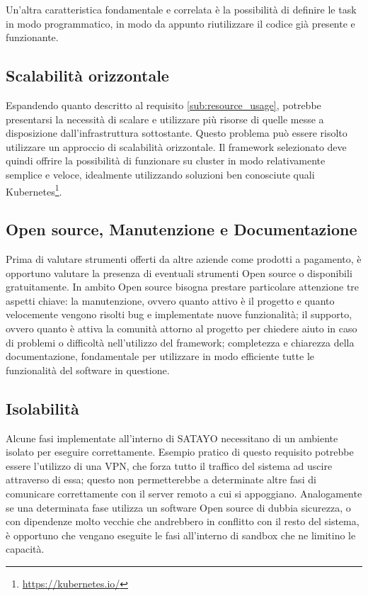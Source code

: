 Un'altra caratteristica fondamentale e correlata è la possibilità di definire le
task in modo programmatico, in modo da appunto riutilizzare il codice già presente
e funzionante.

\subsection{Scalabilità orizzontale}
\label{sub:scalable}

Espandendo quanto descritto al requisito \ref{sub:resource_usage}, potrebbe presentarsi
la necessità di scalare e utilizzare più risorse di quelle messe a disposizione dall'infrastruttura
sottostante. Questo problema può essere risolto utilizzare un approccio di
scalabilità orizzontale. Il framework selezionato deve quindi offrire la possibilità
di funzionare su cluster in modo relativamente semplice e veloce, idealmente
utilizzando soluzioni ben conosciute quali Kubernetes\footnote{\url{https://kubernetes.io/}}.

\subsection{Open source, Manutenzione e Documentazione}
\label{sub:open_source}

Prima di valutare strumenti offerti da altre aziende come prodotti a pagamento, è
opportuno valutare la presenza di eventuali strumenti Open source o disponibili gratuitamente.
In ambito Open source bisogna prestare particolare attenzione tre aspetti chiave:
la manutenzione, ovvero quanto attivo è il progetto e quanto velocemente vengono
risolti bug e implementate nuove funzionalità; il supporto, ovvero quanto è
attiva la comunità attorno al progetto per chiedere aiuto in caso di problemi o
difficoltà nell'utilizzo del framework; completezza e chiarezza della documentazione,
fondamentale per utilizzare in modo efficiente tutte le funzionalità del
software in questione.

\subsection{Isolabilità}
\label{sub:isolation}

Alcune fasi implementate all'interno di SATAYO necessitano di un ambiente isolato
per eseguire correttamente. Esempio pratico di questo requisito potrebbe essere
l'utilizzo di una VPN, che forza tutto il traffico del sistema ad uscire attraverso
di essa; questo non permetterebbe a determinate altre fasi di comunicare
correttamente con il server remoto a cui si appoggiano. Analogamente se una determinata
fase utilizza un software Open source di dubbia sicurezza, o con dipendenze
molto vecchie che andrebbero in conflitto con il resto del sistema, è opportuno che
vengano eseguite le fasi all'interno di sandbox che ne limitino le capacità.

